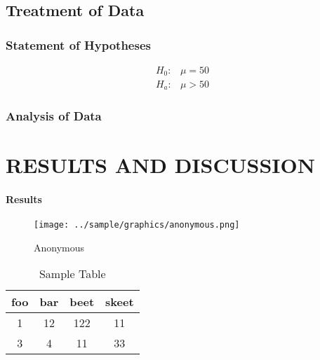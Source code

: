 \documentclass{strrespaper-trad}
\begin{document}
	    \subsection{Treatment of Data}
	        \subsubsection{Statement of Hypotheses} \vspace{-2em}
	            \begin{align*}
	                H_0: & \mu = 50 \\
	                H_a: & \mu > 50
	            \end{align*}
	        \subsubsection{Analysis of Data}
	            \lipsum[4]

    \section{RESULTS AND DISCUSSION}
	    \paragraph{Results}
	        \lipsum[13]
	        \begin{figure}[ht]
	            \centering
	            \texttt{[image: ../sample/graphics/anonymous.png]}
	            \caption[Anonymous]{Anonymous}
	            \label{fig:anonymous}
	        \end{figure}

	        \lipsum[15]

	        \begin{table}[ht]
	            \centering
	            \caption[Sample Table]{Sample Table}
	            \begin{tabular}{cccc}
	                \toprule
	                foo & bar & beet & skeet \\
	                \midrule
	                1   & 12  & 122  & 11    \\
	                3   & 4   & 11   & 33    \\
	                \bottomrule
	            \end{tabular}
	            \label{tab:sampletable}
	        \end{table}

	        \lipsum[14]
\end{document}
